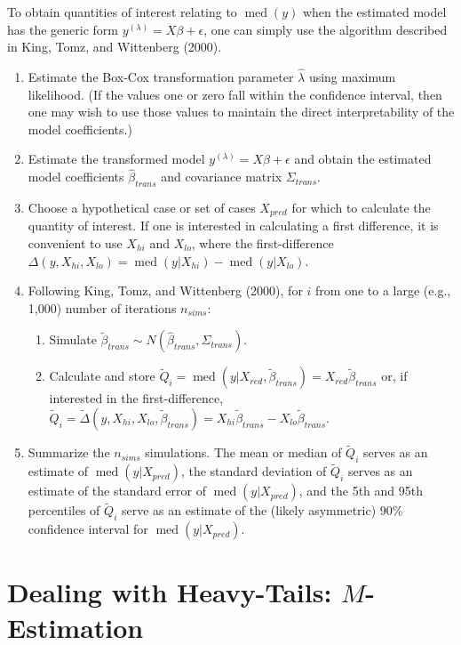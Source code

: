 \documentclass[12pt]{article}
\DeclareMathOperator{\med}{med}
\begin{document}
To obtain quantities of interest relating to $\med(y)$ when the estimated model has the generic form $y^{(\lambda)} = X\beta + \epsilon$, one can simply use the algorithm described in King, Tomz, and Wittenberg (2000).
\begin{enumerate}
\item Estimate the Box-Cox transformation parameter $\hat{\lambda}$ using maximum likelihood. (If the values one or zero fall within the confidence interval, then one may wish to use those values to maintain the direct interpretability of the model coefficients.)
\item Estimate the transformed model $y^{(\lambda)} = X\beta + \epsilon$ and obtain the estimated model coefficients $\hat{\beta}_{trans}$ and covariance matrix $\Sigma_{trans}$.
\item Choose a hypothetical case or set of cases $X_{pred}$ for which to calculate the quantity of interest. 
If one is interested in calculating a first difference, it is convenient to use $X_{hi}$ and $X_{lo}$, where the first-difference $\Delta(y, X_{hi}, X_{lo}) = \med(y | X_{hi}) - \med(y | X_{lo})$.
\item Following King, Tomz, and Wittenberg (2000), for $i$ from one to a large (e.g., 1,000) number of iterations $n_{sims}$:
        \begin{enumerate}
        \item Simulate $\tilde{\beta}_{trans} \sim N\left(\hat{\beta}_{trans}, \Sigma_{trans}\right)$.
        \item Calculate and store $\tilde{Q}_i = \med(y | X_{red}, \tilde{\beta}_{trans}) = X_{red}\tilde{\beta}_{trans}$ or, if interested in the first-difference, $\tilde{Q}_i = \tilde{\Delta}(y, X_{hi}, X_{lo}, \tilde{\beta}_{trans}) = X_{hi}\tilde{\beta}_{trans} - X_{lo}\tilde{\beta}_{trans}$.
        \end{enumerate}
\item Summarize the $n_{sims}$ simulations. 
The mean or median of $\tilde{Q}_i$ serves as an estimate of $\med(y | X_{pred})$, the standard deviation of $\tilde{Q}_i$ serves as an estimate of the standard error of $\med(y | X_{pred})$, and the 5th and 95th percentiles of $\tilde{Q}_i$ serve as an estimate of the (likely asymmetric) 90\% confidence interval for $\med(y | X_{pred})$.
\end{enumerate}

\section*{Dealing with Heavy-Tails: $M$-Estimation}
\end{document}
